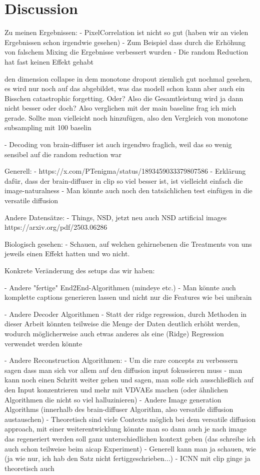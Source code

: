 \chapter{Discussion}


Zu meinen Ergebnissen:
- PixelCorrelation ist nicht so gut (haben wir an vielen Ergebnissen schon irgendwie gesehen)
    - Zum Beispiel dass durch die Erhöhung von falschem Mixing die Ergebnisse verbessert wurden
    - Die random Reduction hat fast keinen Effekt gehabt


den dimension collapse in dem monotone dropout ziemlich gut nochmal gesehen, es wird nur noch auf das abgebildet, was das modell schon kann
aber auch ein Bisschen catastrophic forgetting. 
Oder?
Also die Gesamtleistung wird ja dann nicht besser oder doch?
Also verglichen mit der main baseline frag ich mich gerade.
Sollte man vielleicht noch hinzufügen, also den Vergleich von monotone subsampling mit 100 baselin

- Decoding von brain-diffuser ist auch irgendwo fraglich, weil das so wenig sensibel auf die random reduction war

Generell:
- https://x.com/PTenigma/status/1893459033379807586
- Erklärung dafür, dass der brain-diffuser in clip so viel besser ist, ist vielleicht einfach die image-naturalness
- Man könnte auch noch den tatsächlichen test einfügen in die versatile diffusion

Andere Datensätze:
- Things, NSD, jetzt neu auch NSD artificial images https://arxiv.org/pdf/2503.06286

Biologisch gesehen:
- Schauen, auf welchen gehirnebenen die Treatments von uns jeweils einen Effekt hatten und wo nicht.

Konkrete Veränderung des setups das wir haben:

- Andere "fertige" End2End-Algorithmen (mindeye etc.)
    - Man könnte auch komplette captions generieren lassen und nicht nur die Features wie bei unibrain \cite{maiUniBrainUnifyImage2023}

- Andere Decoder Algorithmen 
    - Statt der ridge regression, durch Methoden in dieser Arbeit könnten teilweise die Menge der Daten deutlich erhöht werden, wodurch möglicherweise auch etwas anderes als eine (Ridge) Regression verwendet werden könnte

- Andere Reconstruction Algorithmen:
    - Um die rare concepts zu verbessern sagen \cite{samuelGeneratingImagesRare2024} dass man sich vor allem auf den diffusion input fokussieren muss
        - man kann noch einen Schritt weiter gehen und sagen, man solle sich ausschließlich auf den Input konzentrieren und mehr mit VDVAEs machen (oder ähnlichen Algorithmen die nicht so viel halluzinieren)
    - Andere Image generation Algorithms (innerhalb des brain-diffuser Algorithm, also versatile diffusion austauschen)
    - Theoretisch sind viele Contexts möglich bei dem versatile diffusion approach, mit einer weiterentwicklung könnte man so dann auch je nach image das regeneriert werden soll ganz unterschiedlichen kontext geben (das schreibe ich auch schon teilweise beim aicap Experiment)
    - Generell kann man ja schauen, wie (ja wie nur, ich hab den Satz nicht fertiggeschrieben...)
    - ICNN mit clip ginge ja theoretisch auch

